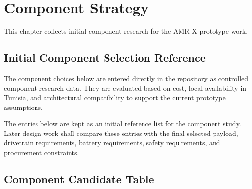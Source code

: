 \chapter{Component Strategy}

This chapter collects initial component research for the AMR-X prototype work.

\section{Initial Component Selection Reference}

The component choices below are entered directly in the repository as controlled component research data. They are evaluated based on cost, local availability in Tunisia, and architectural compatibility to support the current prototype assumptions.

The entries below are kept as an initial reference list for the component study. Later design work shall compare these entries with the final selected payload, drivetrain requirements, battery requirements, safety requirements, and procurement constraints.

\section{Component Candidate Table}


